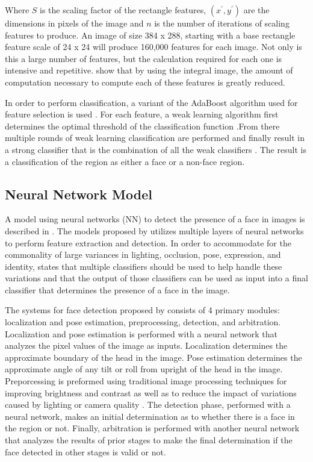Where $S$ is the scaling factor of the rectangle features, $(x^\prime, y^\prime)$ are the dimensions in pixels of the image and $n$ is the number of iterations of scaling features to produce. 
An image of size 384 x 288, starting with a base rectangle feature scale of 24 x 24 will produce 160,000 features for each image. Not only is this a large number of features, but the calculation required for each one is intensive and repetitive. \cite{viola2004robust} show that by using the integral image, the amount of computation necessary to compute each of these features is greatly reduced.

In order to perform classification, a variant of the AdaBoost algorithm used for feature selection is used \cite{viola2004robust}. For each feature, a weak learning algorithm first determines the optimal threshold of the classification function \cite{viola2004robust}.From there multiple rounds of weak learning classification are performed and finally result in a strong classifier that is the combination of all the weak classifiers \cite{viola2004robust}. The result is a classification of the region as either a face or a non-face region. 


\subsection{Neural Network Model}
A model using neural networks (NN) to detect the presence of a face in images is described in \cite{rowley1998nn}. The models proposed by \cite{rowley1998nn} utilizes multiple layers of neural networks to perform feature extraction and detection. In order to accommodate for the commonality of large variances in lighting, occlusion, pose, expression, and identity, \cite{rowley1998nn} states that multiple classifiers should be used to help handle these variations and that the output of those classifiers can be used as input into a final classifier that determines the presence of a face in the image.

The systems for face detection proposed by \cite{rowley1998nn} consists of 4 primary modules: localization and pose estimation, preprocessing, detection, and arbitration. Localization and pose estimation is performed with a neural network that analyzes the pixel values of the image as inputs. Localization determines the approximate boundary of the head in the image. Pose estimation determines the approximate angle of any tilt or roll from upright of the head in the image. Preporcessing is preformed using traditional image processing techniques for improving brightness and contrast as well as to reduce the impact of variations caused by lighting or camera quality \cite{rowley1998nn}. The detection phase, performed with a neural network, makes an initial determination as to whether there is a face in the region or not. Finally, arbitration is performed with another neural network that analyzes the results of prior stages to make the final determination if the face detected in other stages is valid or not.


